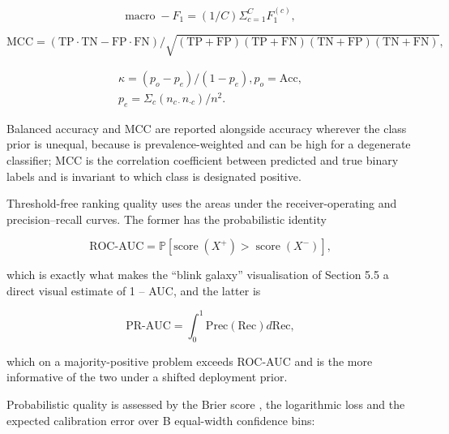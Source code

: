 \begin{equation}
\label{eq:143}
\text{macro}\;-F_{1} = (1/C) \Sigma _{c=1}^{C} F_{1}^{(c)},
\end{equation}

\begin{equation}
\label{eq:144}
\mathrm{MCC} = ( \mathrm{TP}\cdot \mathrm{TN} - \mathrm{FP}\cdot \mathrm{FN} ) / \sqrt{(\mathrm{TP}+\mathrm{FP})(\mathrm{TP}+\mathrm{FN})(\mathrm{TN}+\mathrm{FP})(\mathrm{TN}+\mathrm{FN})},
\end{equation}

\begin{equation}
\label{eq:145}
\begin{aligned}
\kappa = ( p_o - p_e ) / ( 1 - p_e ), p_o = \mathrm{Acc}, \\
p_e = \Sigma _c ( n_{c\cdot } n_{\cdot c} ) / n^{2} .
\end{aligned}
\end{equation}

Balanced accuracy  and MCC   are reported alongside accuracy wherever the class prior is unequal, because  is prevalence-weighted and can be high for a degenerate classifier; MCC is the correlation coefficient between predicted and true binary labels and is invariant to which class is designated positive.

Threshold-free ranking quality uses the areas under the receiver-operating and precision--recall curves. The former has the probabilistic identity

\begin{equation}
\label{eq:146}
\mathrm{ROC\text{-}AUC} = \mathbb{P}[ \text{score}\;(X^{+}) > \;\text{score}\;(X^{-}) ] ,
\end{equation}

which is exactly what makes the ``blink galaxy'' visualisation of Section 5.5 a direct visual estimate of 1 -- AUC, and the latter  is

\begin{equation}
\label{eq:147}
\mathrm{PR\text{-}AUC} = \int _{0}^{1} \mathrm{Prec}( \mathrm{Rec} ) d \mathrm{Rec} ,
\end{equation}

which on a majority-positive problem exceeds ROC-AUC and is the more informative of the two under a shifted deployment prior.

Probabilistic quality is assessed by the Brier score , the logarithmic loss and the expected calibration error  over B equal-width confidence bins:

